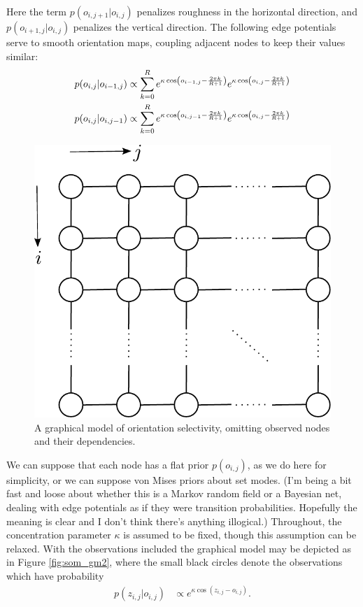 \documentclass[11pt]{article}
\begin{document}
\noindent Here the term $p(o_{i,j+1}|o_{i,j})$ penalizes roughness in the horizontal direction, and $p(o_{i+1,j}|o_{i,j})$ penalizes the vertical direction. The following edge potentials serve to smooth orientation maps, coupling adjacent nodes to keep their values similar:
%
\begin{align}
p(o_{i,j}|o_{i-1,j}) &\propto \sum_{k=0}^R e^{\kappa \cos\left(o_{i-1,j}-\frac{2\pi k}{R+1}\right)} e^{\kappa \cos\left(o_{i,j}-\frac{2\pi k}{R+1}\right)} \\
p(o_{i,j}|o_{i,j-1}) &\propto \sum_{k=0}^R e^{\kappa \cos\left(o_{i,j-1}-\frac{2\pi k}{R+1}\right)} e^{\kappa \cos\left(o_{i,j}-\frac{2\pi k}{R+1}\right)} \notag
\end{align}
%
\begin{figure}[h]
\centering
\includegraphics[scale=0.50]{../fig/col_grid_gm}
\caption{A graphical model of orientation selectivity, omitting observed nodes and their dependencies.}
\label{fig:som_gm0}
\end{figure}

\noindent We can suppose that each node has a flat prior $p(o_{i,j})$, as we do here for simplicity, or we can suppose von Mises priors about set modes. (I'm being a bit fast and loose about whether this is a Markov random field or a Bayesian net, dealing with edge potentials as if they were transition probabilities. Hopefully the meaning is clear and I don't think there's anything illogical.) Throughout, the concentration parameter $\kappa$ is assumed to be fixed, though this assumption can be relaxed. With the observations included the graphical model may be depicted as in Figure \ref{fig:som_gm2}, where the small black circles denote the observations which have probability
%
\begin{align}
p(z_{i,j}|o_{i,j}) &\propto e^{\kappa \cos(z_{i,j}-o_{i,j})}.
\end{align}
\end{document}
